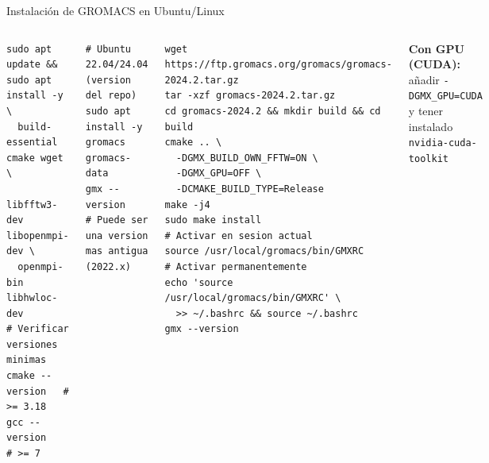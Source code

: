 \documentclass[aspectratio=169, 10pt]{beamer}
\begin{document}
\begin{frame}[fragile,shrink=8]{Instalación de GROMACS en Ubuntu/Linux}
\begin{columns}[T]
\begin{tcolorbox}[definitionbox, title={Prerrequisitos}]
\begin{lstlisting}[style=bashstyle]
sudo apt update && sudo apt install -y \
  build-essential cmake wget \
  libfftw3-dev libopenmpi-dev \
  openmpi-bin libhwloc-dev
# Verificar versiones minimas
cmake --version   # >= 3.18
gcc --version     # >= 7
\end{lstlisting}
\end{tcolorbox}
\vspace{0.3em}
\begin{tcolorbox}[warningbox, title={Opción rápida: paquete apt}]
\begin{lstlisting}[style=bashstyle]
# Ubuntu 22.04/24.04 (version del repo)
sudo apt install -y gromacs gromacs-data
gmx --version
# Puede ser una version mas antigua (2022.x)
\end{lstlisting}
\end{tcolorbox}
\column{0.48\textwidth}
\begin{tcolorbox}[formulabox, title={Opción recomendada: compilar GROMACS 2024.2}]
\begin{lstlisting}[style=bashstyle]
wget https://ftp.gromacs.org/gromacs/gromacs-2024.2.tar.gz
tar -xzf gromacs-2024.2.tar.gz
cd gromacs-2024.2 && mkdir build && cd build
cmake .. \
  -DGMX_BUILD_OWN_FFTW=ON \
  -DGMX_GPU=OFF \
  -DCMAKE_BUILD_TYPE=Release
make -j4
sudo make install
# Activar en sesion actual
source /usr/local/gromacs/bin/GMXRC
# Activar permanentemente
echo 'source /usr/local/gromacs/bin/GMXRC' \
  >> ~/.bashrc && source ~/.bashrc
gmx --version
\end{lstlisting}
\end{tcolorbox}
\begin{tcolorbox}[comparisonbox]
\small\textbf{Con GPU (CUDA):} añadir \texttt{-DGMX\_GPU=CUDA} \\y tener instalado \texttt{nvidia-cuda-toolkit}
\end{tcolorbox}
\end{columns}
\end{frame}
\end{document}
